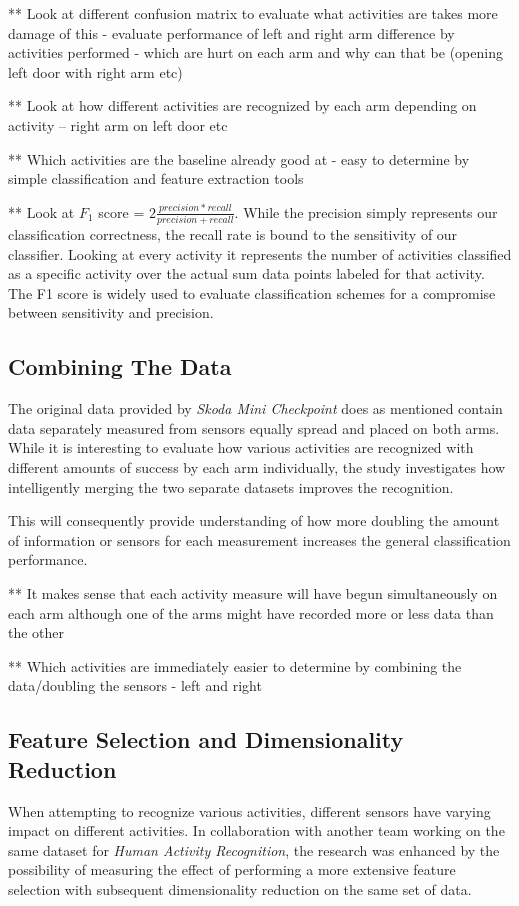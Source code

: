 \documentclass{sig-alternate}
\begin{document}
** Look at different confusion matrix to evaluate what activities are takes more damage of this - evaluate performance of left and right arm difference by activities performed - which are hurt on each arm and why can that be (opening left door with right arm etc)

** Look at how different activities are recognized by each arm depending on activity -- right arm on left door etc

** Which activities are the baseline already good at - easy to determine by simple classification and feature extraction tools

** Look at $F_1$ score = $2\frac{precision*recall}{precision + recall}$.
While the precision simply represents our classification correctness, the recall rate is bound to the sensitivity of our classifier. Looking at every activity it represents the number of activities classified as a specific activity over the actual sum data points labeled for that activity. The F1 score is widely used to evaluate classification schemes for a compromise between sensitivity and precision.

\subsection{Combining The Data}
The original data provided by \textit{Skoda Mini Checkpoint} does as mentioned contain data separately measured from sensors equally spread and placed on both arms. While it is interesting to evaluate how various activities are recognized with different amounts of success by each arm individually, the study investigates how intelligently merging the two separate datasets improves the recognition. 

This will consequently provide understanding of how more doubling the amount of information or sensors for each measurement increases the general classification performance.

** It makes sense that each activity measure will have begun simultaneously on each arm although one of the arms might have recorded more or less data than the other

** Which activities are immediately easier to determine by combining the data/doubling the sensors - left and right

\subsection{Feature Selection and Dimensionality Reduction}
When attempting to recognize various activities, different sensors have varying impact on different activities. In collaboration with another team working on the same dataset for \textit{Human Activity Recognition}, the research was enhanced by the possibility of measuring the effect of performing a more extensive feature selection with subsequent dimensionality reduction on the same set of data. 
\end{document}
